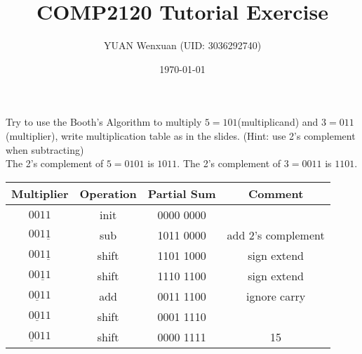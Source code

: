 \documentclass{exam}
\title{COMP2120 Tutorial Exercise}
\author{YUAN Wenxuan (UID: 3036292740)}
\date{\today}
\begin{document}
\maketitle

Try to use the Booth's Algorithm to multiply $5=101$(multiplicand) and $3=011$(multiplier),
write multiplication table as in the slides. (Hint: use 2's complement when subtracting) \\


The 2's complement of $5=0101$ is $1011$.
The 2's complement of $3=0011$ is $1101$.

\begin{table}[!ht]
    \centering
    \begin{tabular}{|c|c|c|c|}
        \hline
        Multiplier         & Operation & Partial Sum & Comment            \\ \hline
        $0011$             & init      & 0000 0000   & ~                  \\
        $001\underline{1}$ & sub       & 1011 0000   & add 2's complement \\
        $001\underline{1}$ & shift     & 1101 1000   & sign extend        \\
        $00\underline{1}1$ & shift     & 1110 1100   & sign extend        \\
        $0\underline{0}11$ & add       & 0011 1100   & ignore carry       \\
        $0\underline{0}11$ & shift     & 0001 1110   & ~                  \\
        $\underline{0}011$ & shift     & 0000 1111   & 15                 \\
        \hline
    \end{tabular}
\end{table}
\end{document}
